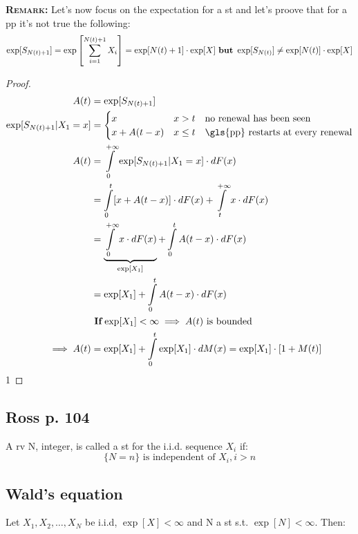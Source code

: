 \textbf{\textsc{Remark:}}
Let's now focus on the expectation for a \gls{st} and let's proove that for a \gls{pp} it's not true the following:
\begin{equation}
  \exp[S_{N(t)+1}] = \exp\left[\sum\limits_{i=1}^{N(t)+1}X_i\right] = \exp[N(t)+1]\cdot \exp[X] \text{  \textbf{but}  } \exp[S_{N(t)}] \neq \exp[N(t)]\cdot \exp[X]
\end{equation}

\begin{proof}
  \begin{equation}\begin{split}
    A(t) &= \exp[S_{N(t)+1}]\\
    \exp[S_{N(t)+1}|X_1=x] &=
    \begin{cases}
      x & x>t \quad \text{no renewal has been seen} \\
      x + A(t-x) & x \le t \quad \text{\gls{pp} restarts at every renewal}
    \end{cases} \\
    A(t) &= \int\limits_0^{+\infty} \exp[S_{N(t)+1}|X_1 = x] \cdot dF(x) \\
    &= \int\limits_0^{t} [x+ A(t-x)] \cdot dF(x) + \int\limits_t^{+\infty} x \cdot dF(x) \\
    &= \underbrace{\int\limits_0^{+\infty} x \cdot dF(x)}_{\exp[X_1]} + \int\limits_0^{t} A(t-x) \cdot dF(x) \\
    &= \exp[X_1] + \int\limits_0^{t} A(t-x) \cdot dF(x)\\
    & \text{ \textbf{If}}\exp[X_1] < \infty \implies A(t) \text{ is bounded} \\
    \implies A(t) &= \exp[X_1] + \int\limits_0^{t} \exp[X_1] \cdot dM(x) = \exp[X_1]\cdot [1+M(t)]\\
  \end{split}\end{equation}1
\end{proof}

\subsection{Ross p. 104}
A \gls{rv} N, integer, is called a \gls{st} for the i.i.d. sequence $X_i$ if:
\begin{equation}
  \{N=n\} \text{ is independent of }X_i , i > n
\end{equation}

\subsection{Wald's equation}
Let $X_1, X_2, \dots, X_N $ be i.i.d,  $\exp[X] < \infty$ and N a \gls{st} s.t. $\exp[N] < \infty$. Then:

